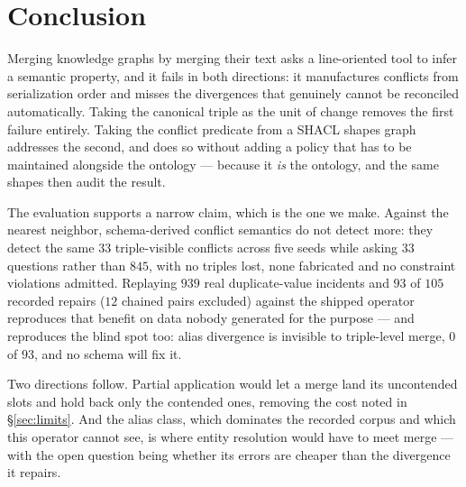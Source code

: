 \section{Conclusion}

Merging knowledge graphs by merging their text asks a line-oriented tool to
infer a semantic property, and it fails in both directions: it manufactures
conflicts from serialization order and misses the divergences that genuinely
cannot be reconciled automatically. Taking the canonical triple as the unit of
change removes the first failure entirely. Taking the conflict predicate from a
SHACL shapes graph addresses the second, and does so without adding a policy
that has to be maintained alongside the ontology --- because it \emph{is} the
ontology, and the same shapes then audit the result.

The evaluation supports a narrow claim, which is the one we make. Against the
nearest neighbor, schema-derived conflict semantics do not detect more: they
detect the same $33$ triple-visible conflicts across five seeds while asking
$33$ questions rather than $845$, with no triples lost, none fabricated and no
constraint violations admitted. Replaying $939$ real duplicate-value incidents and
$93$ of $105$ recorded repairs ($12$ chained pairs excluded) against the shipped
operator reproduces that benefit on data nobody generated for the purpose --- and reproduces the blind spot too:
alias divergence is invisible to triple-level merge, $0$ of $93$, and no schema
will fix it.

Two directions follow. Partial application would let a merge land its
uncontended slots and hold back only the contended ones, removing the cost
noted in \S\ref{sec:limits}. And the alias class, which dominates the recorded
corpus and which this operator cannot see, is where entity resolution would have
to meet merge --- with the open question being whether its errors are cheaper
than the divergence it repairs.
